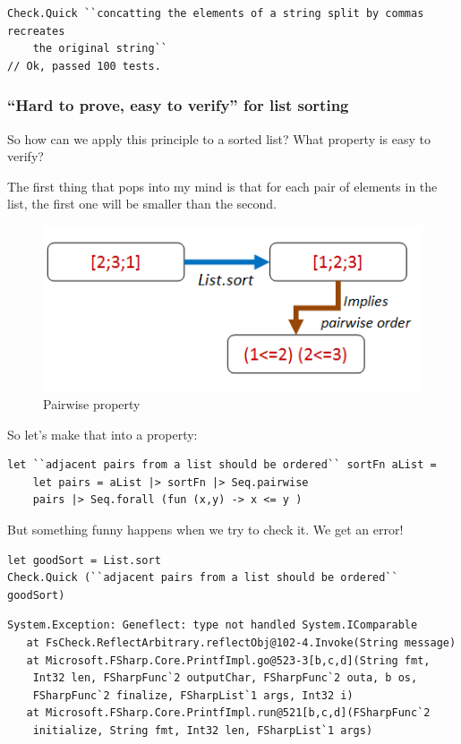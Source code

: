\begin{verbatim}
Check.Quick ``concatting the elements of a string split by commas recreates 
    the original string`` 
// Ok, passed 100 tests.
\end{verbatim}

\subsubsection{``Hard to prove, easy to verify'' for list
sorting}\label{hard-to-prove-easy-to-verify-for-list-sorting}

So how can we apply this principle to a sorted list? What property is
easy to verify?

The first thing that pops into my mind is that for each pair of elements
in the list, the first one will be smaller than the second.

\begin{figure}[htbp]
\centering
\includegraphics{pics/property_list_sort_pairwise.png}
\caption{Pairwise property}
\end{figure}

So let's make that into a property:

\begin{verbatim}
let ``adjacent pairs from a list should be ordered`` sortFn aList = 
	let pairs = aList |> sortFn |> Seq.pairwise
	pairs |> Seq.forall (fun (x,y) -> x <= y )
\end{verbatim}
But something funny happens when we try to check it. We get an error!

\begin{verbatim}
let goodSort = List.sort
Check.Quick (``adjacent pairs from a list should be ordered`` goodSort)
\end{verbatim}
\begin{verbatim}
System.Exception: Geneflect: type not handled System.IComparable
   at FsCheck.ReflectArbitrary.reflectObj@102-4.Invoke(String message)
   at Microsoft.FSharp.Core.PrintfImpl.go@523-3[b,c,d](String fmt, 
    Int32 len, FSharpFunc`2 outputChar, FSharpFunc`2 outa, b os, 
    FSharpFunc`2 finalize, FSharpList`1 args, Int32 i)
   at Microsoft.FSharp.Core.PrintfImpl.run@521[b,c,d](FSharpFunc`2 
    initialize, String fmt, Int32 len, FSharpList`1 args)
\end{verbatim}

